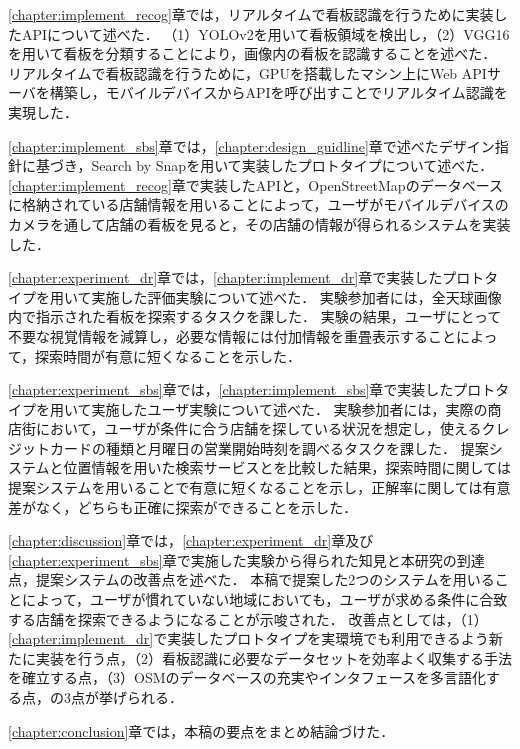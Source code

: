   \ref{chapter:implement_recog}章では，リアルタイムで看板認識を行うために実装したAPIについて述べた．
  （1）YOLOv2を用いて看板領域を検出し，（2）VGG16を用いて看板を分類することにより，画像内の看板を認識することを述べた．
  リアルタイムで看板認識を行うために，GPUを搭載したマシン上にWeb APIサーバを構築し，モバイルデバイスからAPIを呼び出すことでリアルタイム認識を実現した．

  \ref{chapter:implement_sbs}章では，\ref{chapter:design_guidline}章で述べたデザイン指針に基づき，Search by Snapを用いて実装したプロトタイプについて述べた．
  \ref{chapter:implement_recog}章で実装したAPIと，OpenStreetMapのデータベースに格納されている店舗情報を用いることによって，ユーザがモバイルデバイスのカメラを通して店舗の看板を見ると，その店舗の情報が得られるシステムを実装した．

  \ref{chapter:experiment_dr}章では，\ref{chapter:implement_dr}章で実装したプロトタイプを用いて実施した評価実験について述べた．
  実験参加者には，全天球画像内で指示された看板を探索するタスクを課した．
  実験の結果，ユーザにとって不要な視覚情報を減算し，必要な情報には付加情報を重畳表示することによって，探索時間が有意に短くなることを示した．

  \ref{chapter:experiment_sbs}章では，\ref{chapter:implement_sbs}章で実装したプロトタイプを用いて実施したユーザ実験について述べた．
  実験参加者には，実際の商店街において，ユーザが条件に合う店舗を探している状況を想定し，使えるクレジットカードの種類と月曜日の営業開始時刻を調べるタスクを課した．
  提案システムと位置情報を用いた検索サービスとを比較した結果，探索時間に関しては提案システムを用いることで有意に短くなることを示し，正解率に関しては有意差がなく，どちらも正確に探索ができることを示した．

  \ref{chapter:discussion}章では，\ref{chapter:experiment_dr}章及び\ref{chapter:experiment_sbs}章で実施した実験から得られた知見と本研究の到達点，提案システムの改善点を述べた．
  本稿で提案した2つのシステムを用いることによって，ユーザが慣れていない地域においても，ユーザが求める条件に合致する店舗を探索できるようになることが示唆された．
  改善点としては，（1）\ref{chapter:implement_dr}で実装したプロトタイプを実環境でも利用できるよう新たに実装を行う点，（2）看板認識に必要なデータセットを効率よく収集する手法を確立する点，（3）OSMのデータベースの充実やインタフェースを多言語化する点，の3点が挙げられる．

  \ref{chapter:conclusion}章では，本稿の要点をまとめ結論づけた．